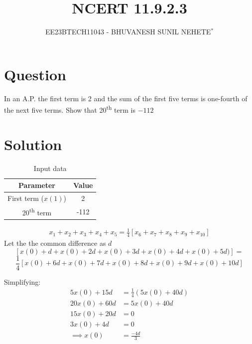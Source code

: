 \documentclass[journal,12pt,twocolumn]{IEEEtran}
\theoremstyle{remark}
\begin{document}

\vspace{3cm}

\title{NCERT 11.9.2.3}
\author{EE23BTECH11043 - BHUVANESH SUNIL NEHETE$^{*}$%
}
\maketitle
\newpage
\bigskip

\renewcommand{\thefigure}{\theenumi}
\renewcommand{\thetable}{\theenumi}



\section*{Question}

In an A.P. the first term is 2 and the sum of the first five terms is one-fourth of the next five terms. Show that 20\textsuperscript{th} term is $-112$

\section*{Solution}
\begin{table}[h]
    \centering
    \begin{tabular}{|c|c|}
        \hline
        \textbf{Parameter} & \textbf{Value} \\
        \hline
        First term (\(x(1)\)) & 2 \\
        \hline
        20\textsuperscript{th} term & -112\\
        \hline
    \end{tabular}
    \caption{Input data}
  \label{Table 1}
\end{table}

   \begin{align}
        x_1 + x_2 + x_3 + x_4 + x_5 = \frac{1}{4} [x_6 + x_7 + x_8 + x_9 + x_{10}]
    \end{align}
Let the the common difference as \(d\)
\[[x(0) + d + x(0) + 2d + x(0) + 3d + x(0) + 4d + x(0) + 5d)] =\]
\[\frac{1}{4} [x(0) + 6d + x(0) + 7d + x(0) + 8d + x(0) + 9d + x(0) + 10d]\]

Simplifying:
    \begin{align}
        5x(0) + 15d &= \frac{1}{4}(5x(0) + 40d)\\
        20x(0) + 60d &= 5x(0) + 40d\\
        15x(0) + 20d &= 0\\
        3x(0) + 4d &= 0\\ 
        \implies x(0) &= \frac{-4d}{3}
    \end{align}
\end{document}
